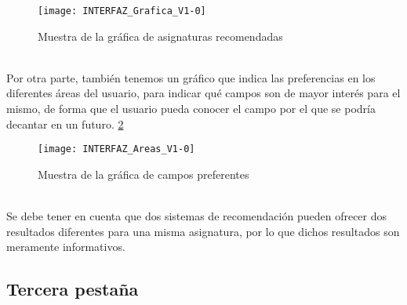 \begin{figure}[h]
\centering
\texttt{[image: INTERFAZ\_Grafica\_V1-0]}
\caption{Muestra de la gráfica de asignaturas recomendadas}
\label{fig:E.2.11}
\end{figure}
\\Por otra parte, también tenemos un gráfico que indica las preferencias en los diferentes áreas del usuario, para indicar qué campos son de mayor interés para el mismo, de forma que el usuario pueda conocer el campo por el que se podría decantar en un futuro. \ref{fig:E.2.12} 
\begin{figure}[h]
\centering
\texttt{[image: INTERFAZ\_Areas\_V1-0]}
\caption{Muestra de la gráfica de campos preferentes}
\label{fig:E.2.12}
\end{figure}
\\
Se debe tener en cuenta que dos sistemas de recomendación pueden ofrecer dos resultados diferentes para una misma asignatura, por lo que dichos resultados son meramente informativos. 

\subsection{Tercera pestaña}







